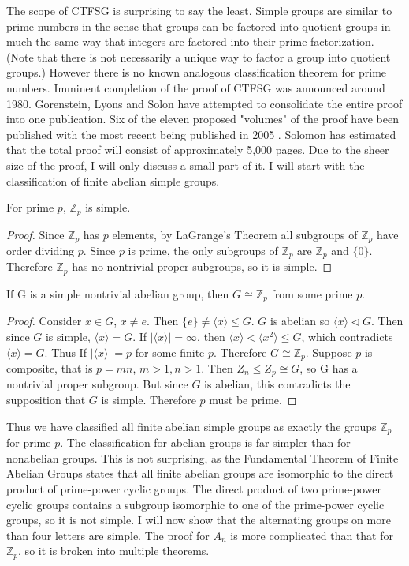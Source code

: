 \documentclass[a4paper]{article}
\begin{document}
The scope of CTFSG is surprising to say the least. Simple groups are similar to prime numbers in the sense that groups can be factored into quotient groups in much the same way that integers are factored into their prime factorization. (Note that there is not necessarily a unique way to factor a group into quotient groups.) However there is no known analogous classification theorem for prime numbers. Imminent completion of the proof of CTFSG was announced around 1980. Gorenstein, Lyons and Solon have attempted to consolidate the entire proof into one publication. Six of the eleven proposed "volumes" of the proof have been published with the most recent being published in 2005 \cite{number6}. Solomon has estimated that the total proof will consist of approximately 5,000 pages. Due to the sheer size of the proof, I will only discuss a small part of it. I will start with the classification of finite abelian simple groups.



\begin{theorem}For prime $p$, $\mathbb{Z}_p$ is simple.
\end{theorem}
\begin{proof}
Since $\mathbb{Z}_p$ has $p$ elements, by LaGrange's Theorem all subgroups of $\mathbb{Z}_p$ have order dividing $p$. Since $p$ is prime, the only subgroups of $\mathbb{Z}_p$ are $\mathbb{Z}_p$ and $\{0\}$. Therefore $\mathbb{Z}_p$ has no nontrivial proper subgroups, so it is simple.
\end{proof}

\begin{theorem}
If G is a simple nontrivial abelian group, then $G \cong \mathbb{Z}_p$ from some prime $p$.
\end{theorem}
\begin{proof}
Consider $x \in G$, $x \neq e$. Then $\{ e \} \neq \langle x \rangle \le G$. $G$ is abelian so $\langle x \rangle \triangleleft G$. Then since $G$ is simple, $\langle x \rangle = G$. If $|\langle x \rangle| = \infty$, then $\langle x \rangle < \langle x^2 \rangle \leq G$, which contradicts $\langle x \rangle = G$. Thus If $|\langle x \rangle| = p$ for some finite $p$. Therefore $G \cong \mathbb{Z}_p$. Suppose $p$ is composite, that is $p = m n$, $m > 1, n > 1$. Then $Z_n \leq Z_p \cong G$, so G has a nontrivial proper subgroup. But since $G$ is abelian, this contradicts the supposition that $G$ is simple. Therefore $p$ must be prime.
\end{proof}

Thus we have classified all finite abelian simple groups as exactly the groups $\mathbb{Z}_p$ for prime $p$. The classification for abelian groups is far simpler than for nonabelian groups. This is not surprising, as the Fundamental Theorem of Finite Abelian Groups states that all finite abelian groups are isomorphic to the direct product of prime-power cyclic groups. The direct product of two prime-power cyclic groups contains a subgroup isomorphic to one of the prime-power cyclic groups, so it is not simple. I will now show that the alternating groups on more than four letters are simple. The proof for $A_n$ is more complicated than that for $\mathbb{Z}_p$, so it is broken into multiple theorems.
\end{document}
